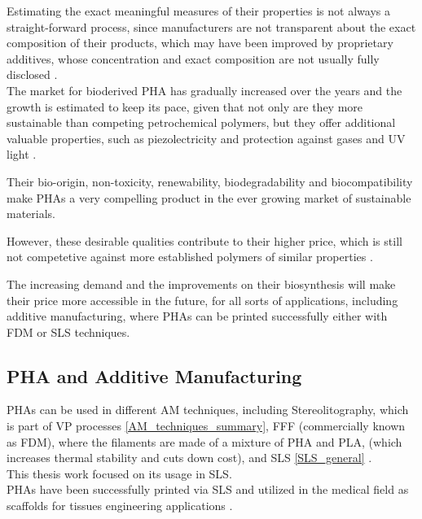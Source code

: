 \documentclass{article}
\begin{document}
    Estimating the exact meaningful measures of their properties is not always a straight-forward process, 
    since manufacturers are not transparent about the exact composition of their products, which may have been 
    improved by proprietary additives, whose concentration and exact composition are not usually fully disclosed \autocite{Kovalcik_PHA_Review}. \\ 
    
    The market for bioderived PHA has gradually increased over the years and the growth is estimated to keep its pace, given that not only are they more sustainable
    than competing petrochemical polymers, but they offer additional valuable properties, such as piezolectricity 
    and protection against gases and UV light \autocite{Kovalcik_PHA_Review}.

    Their bio-origin, non-toxicity, renewability, biodegradability and biocompatibility make PHAs a very compelling product in the 
    ever growing market of sustainable materials. 

    However, these desirable qualities contribute to their higher price, which is still not competetive against more established 
    polymers of similar properties \autocite{Kovalcik_PHA_Review}. 

    The increasing demand and the improvements on their biosynthesis will make their price more accessible in the future, for all sorts of 
    applications, including additive manufacturing, where PHAs can be printed successfully either with FDM or SLS techniques. \clearpage

    
    \subsection{PHA and Additive Manufacturing \label{PHA_in_Additive}}

    PHAs can be used in different AM techniques, including Stereolitography, which is part of VP processes \ref{AM_techniques_summary}, 
    FFF (commercially known as FDM), where the filaments are made of a mixture of PHA and PLA, 
    (which increases thermal stability and cuts down cost), and 
    SLS \ref{SLS_general} \autocite{Kovalcik_PHA_Review}. \\ 

    This thesis work focused on its usage in SLS. \\ 

    PHAs have been successfully printed via SLS and utilized in the medical field as scaffolds for tissues engineering applications \autocites{Messori_Bondioli_PHAs}. 
\end{document}
